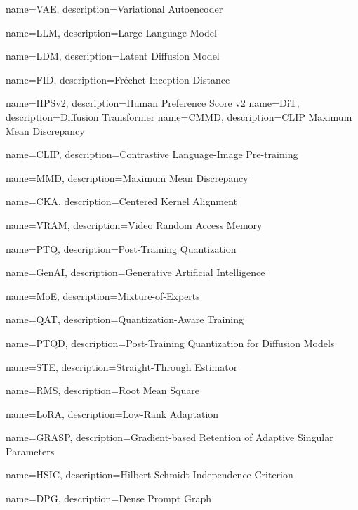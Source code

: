 {
    name=VAE,
    description={Variational Autoencoder}
}

{
    name=LLM,
    description={Large Language Model}
}

{
	name=LDM,
	description={Latent Diffusion Model}
}

{
	name=FID,
	description={Fr\'echet Inception Distance}
}

{
	name=HPSv2,
	description={Human Preference Score v2}
}
{
	name=DiT,
	description={Diffusion Transformer}
}
{
	name=CMMD,
	description={CLIP Maximum Mean Discrepancy}
}

{
	name=CLIP,
	description={Contrastive Language-Image Pre-training}
}


{
	name=MMD,
	description={Maximum Mean Discrepancy}
}

{
	name=CKA,
	description={Centered Kernel Alignment}
}

{
	name=VRAM,
	description={Video Random Access Memory}
}

{
	name=PTQ,
	description={Post-Training Quantization}
}

{
	name=GenAI,
	description={Generative Artificial Intelligence}
}

{
	name=MoE,
	description={Mixture-of-Experts}
}

{
	name=QAT,
	description={Quantization-Aware Training}
}

{
	name=PTQD,
	description={Post-Training Quantization for Diffusion Models}
}

{
	name=STE,
	description={Straight-Through Estimator}
}

{
	name=RMS,
	description={Root Mean Square}
}

{
	name=LoRA,
	description={Low-Rank Adaptation}
}

{
	name=GRASP,
	description={Gradient-based Retention of Adaptive Singular Parameters}
}

{
	name=HSIC,
	description={Hilbert-Schmidt Independence Criterion}
}

{
	name=DPG,
	description={Dense Prompt Graph}
}

